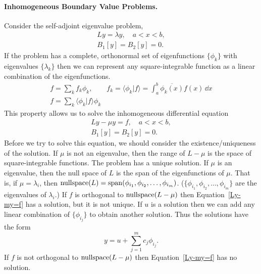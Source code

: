 \paragraph{Inhomogeneous Boundary Value Problems.}
Consider the self-adjoint eigenvalue problem,
\begin{gather*}
  L y = \lambda y, \quad a < x < b, \\
  B_1[y] = B_2[y] = 0.
\end{gather*}
If the problem has a complete, orthonormal set of eigenfunctions
$\{ \phi_k \}$ with eigenvalues $\{ \lambda_k \}$ then we can
represent any square-integrable function as a linear combination 
of the eigenfunctions.
\begin{gather*}
  f = \sum_k f_k \phi_k, \qquad
  f_k = \langle \phi_k | f \rangle = \int_a^b \overline{\phi_k(x)} f(x) \,\dd x \\
  f = \sum_k \langle \phi_k | f \rangle \phi_k
\end{gather*}
This property allows us to solve the inhomogeneous differential
equation
\begin{gather}
  \label{Ly-my=f}
  L y - \mu y = f, \quad a < x < b, \\
  \nonumber
  B_1[y] = B_2[y] = 0.
\end{gather}
Before we try to solve this equation, we should consider the
existence/uniqueness of the solution.  If $\mu$ is not an eigenvalue,
then the range of $L - \mu$ is the space of square-integrable functions.  The
problem has a unique solution.  If $\mu$ is an eigenvalue, then the
null space of $L$ is the span of the eigenfunctions of $\mu$.
That is, if $\mu = \lambda_i$, then
$\mathop{\mathrm{nullspace}}\nolimits(L) = \mathop{\mathrm{span}}\nolimits(\phi_{i_1}, \phi_{i_2}, \ldots,
\phi_{i_m})$.  ($\{ \phi_{i_1}, \phi_{i_2}, \ldots,
\phi_{i_m} \}$ are the eigenvalues of $\lambda_i$.)
If $f$ is orthogonal to $\mathop{\mathrm{nullspace}}\nolimits(L-\mu)$ then Equation~\ref{Ly-my=f}
has a solution, but it is not unique.  If $u$ is a solution then we
can add any linear combination of $\{ \phi_{i_j} \}$
to obtain another solution. Thus the solutions have the form
\[
y = u + \sum_{j = 1}^m c_j \phi_{i_j}.
\]
If $f$ is not orthogonal to $\mathop{\mathrm{nullspace}}\nolimits(L-\mu)$ then Equation~\ref{Ly-my=f}
has no solution.


